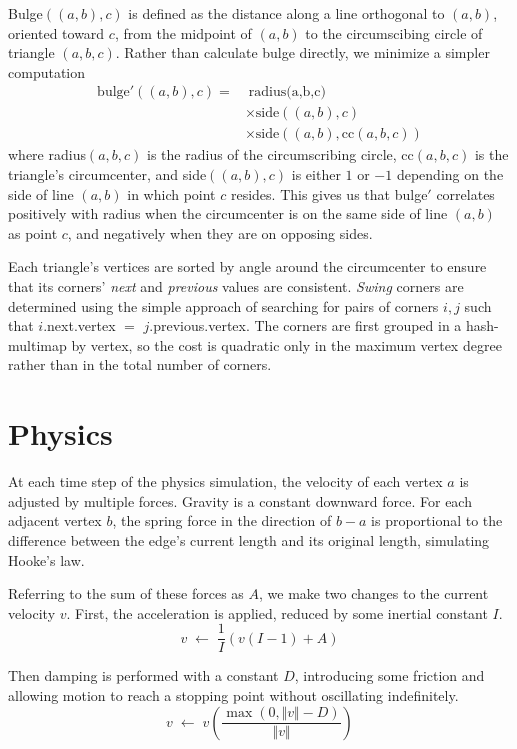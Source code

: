 \documentclass{article}
\def\p{\hspace{0pt}}
\begin{document}
Bulge$((a,b),c)$ is defined as the distance along a line
orthogonal to $(a,b)$, oriented toward $c$, from the
midpoint of $(a,b)$ to the circumscibing circle of
triangle $(a,b,c)$. Rather than calculate bulge directly,
we minimize a simpler computation
\begin{align*} \text{bulge}'((a,b),c) =&\;
\text{radius(a,b,c)}\\
&\times \text{side}((a,b), c) \\
&\times \text{side}((a,b), \text{cc}(a,b,c))
\end{align*}
where radius$(a,b,c)$ is the radius of the circumscribing
circle, cc$(a,b,c)$ is the triangle's circumcenter,
and side$((a,b),c)$ is either $1$ or $-1$ depending on
the side of line $(a,b)$ in which point $c$ resides.
This gives us that bulge$'$ correlates positively
with radius when the circumcenter is on the same side of
line $(a,b)$ as point $c$, and negatively when they
are on opposing sides.

Each triangle's vertices are sorted by angle around the
circumcenter to ensure that its corners'
\textit{next} and \textit{previous} values are consistent.
\textit{Swing} corners are determined using the simple
approach of searching for pairs of corners $i,j$ such that
$i${\p}.next{\p}.vertex $=$ $j${\p}.previous{\p}.vertex.
The corners are first grouped in a hash-multimap by vertex,
so the cost is quadratic only in the maximum vertex degree
rather than in the total number of corners.

\section{Physics}

At each time step of the physics simulation, the velocity
of each vertex $a$ is adjusted by multiple forces.
Gravity is a constant downward force.
For each adjacent vertex $b$, the spring force in the
direction of $b-a$ is proportional to the difference
between the edge's current length and its original length,
simulating Hooke's law.

Referring to the sum of these forces as $A$, we make
two changes to the current velocity $v$.
First, the acceleration is applied, reduced by some
inertial constant $I$.
\[ v \; \leftarrow \; \frac{1}{I}\left(v(I-1)+A\right) \]

Then damping is performed with a constant $D$,
introducing some friction and allowing motion to reach
a stopping point without oscillating indefinitely.
\[ v \; \leftarrow \; v \left( \frac{
  \max\left( 0, \Vert v \Vert - D \right)
}{\Vert v \Vert} \right) \]
\end{document}
